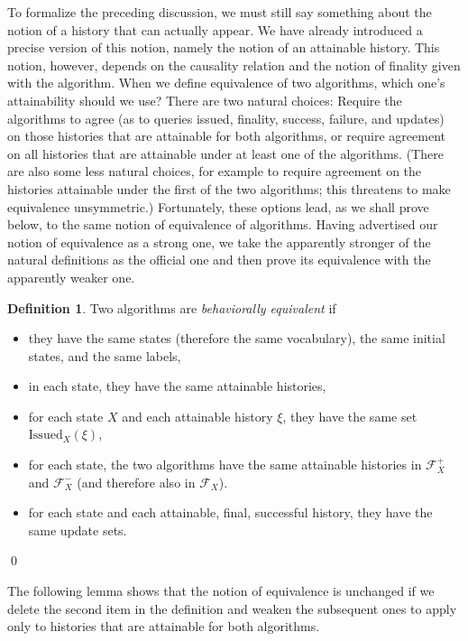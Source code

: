 \documentclass{LMCS}
\theoremstyle{definition}
\newtheorem{df}[thm]{Definition}
\newenvironment{ls}{\begin{itemize}}{\end{itemize}}
\newcommand{\scr}[1]{\ensuremath{\mathcal {#1}}}
\newcommand{\Issued}{\text{Issued}}
\begin{document}
To formalize the preceding discussion, we must still say something
about the notion of a history that can actually appear.  We have
already introduced a precise version of this notion, namely the notion
of an attainable history.  This notion, however, depends on the
causality relation and the notion of finality given with the
algorithm.  When we define equivalence of two algorithms, which one's
attainability should we use?  There are two natural choices: Require
the algorithms to agree (as to queries issued, finality, success,
failure, and updates) on those histories that are attainable for both
algorithms, or require agreement on all histories that are attainable
under at least one of the algorithms.  (There are also some less
natural choices, for example to require agreement on the histories
attainable under the first of the two algorithms; this threatens to
make equivalence unsymmetric.)  Fortunately, these options lead, as we
shall prove below, to the same notion of equivalence of algorithms.
Having advertised our notion of equivalence as a strong one, we take
the apparently stronger of the natural definitions as the official one
and then prove its equivalence with the apparently weaker one.

\begin{df}   \label{equiv-def}
Two algorithms are \emph{behaviorally equivalent} if
\begin{ls}
  \item they have the same states (therefore the same vocabulary), the
  same initial states, and the same labels,
  \item in each state, they have the same attainable histories,
  \item for each state $X$ and each attainable history $\xi$, they
  have the same set $\Issued_X(\xi)$,
  \item for each state, the two algorithms have the same attainable
  histories in $\scr F_X^+$
  and $\scr F_X^-$ (and therefore also in $\scr F_X$).
  \item for each state and each attainable, final, successful
  history, they have the same update sets.
\end{ls}
\qed\end{df}

The following lemma shows that the notion of equivalence is unchanged
if we delete the second item in the definition and weaken the
subsequent ones to apply only to histories that are attainable for
both algorithms.
\end{document}

